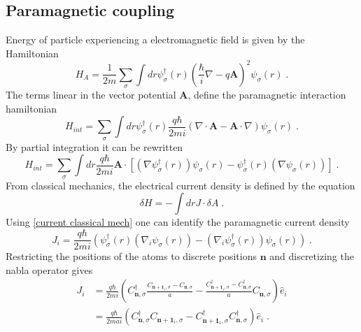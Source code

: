 \documentclass{article}
\begin{document}
\subsection{Paramagnetic coupling}
Energy of particle experiencing a electromagnetic field is given by the Hamiltonian
\begin{equation}
    H_A = \frac{1}{2m} \sum_{\sigma} \int dr \psi_{\sigma}^{\dagger}(r) \left( \frac{\hbar}{i} \nabla - q \textbf{A} \right)^2 \psi_{\sigma}(r)\;.
\end{equation}
The terms linear in the vector potential $\textbf{A}$, define the paramagnetic interaction hamiltonian 
\begin{equation}
    H_{int} = \sum_{\sigma} \int dr  \psi_{\sigma}^{\dagger}(r) \frac{q\hbar}{2mi}\left(  \nabla \cdot \textbf{A}  -  \textbf{A} \cdot \nabla \right) \psi_{\sigma}(r) \;.
\end{equation}
By partial integration it can be rewritten
\begin{equation}
    H_{int} = \sum_{\sigma} \int dr \frac{q\hbar}{2mi} \textbf{A} \cdot \left[  (\nabla  \psi_{\sigma}^{\dagger}(r)) \psi_{\sigma}(r)   -   \psi_{\sigma}^{\dagger}(r) (\nabla \psi_{\sigma}(r))  \right] \;.
\end{equation}
From classical mechanics, the electrical current density is defined by the equation
\begin{equation}
    \delta H = - \int dr J \cdot \delta A \;.
    \label{current classical mech}
\end{equation}
Using \cref{current classical mech} one can identify the paramagnetic current density
\begin{equation}
    J_i = \frac{q \hbar}{2mi} (\psi_{\sigma}^{\dagger}(r) (\nabla_i \psi_{\sigma}(r)) - (\nabla_i  \psi_{\sigma}^{\dagger}(r)) \psi_{\sigma}(r))\;.
\end{equation}
Restricting the positions of the atoms to discrete positions $\textbf{n}$ and discretizing the nabla operator gives
\begin{align}
    J_i &= \frac{q \hbar}{2mi} (C_{\textbf{n},\sigma}^{\dagger} \frac{C_{\textbf{n} + \textbf{1}_i,\sigma} - C_{\textbf{n},\sigma}}{a}  - \frac{C_{\textbf{n} + \textbf{1}_i,\sigma}^{\dagger} - C_{\textbf{n},\sigma}^{\dagger}}{a} C_{\textbf{n},\sigma}) \hat{e}_i\nonumber\\
      &= \frac{q \hbar}{2mai} (C_{\textbf{n},\sigma}^{\dagger} C_{\textbf{n} + \textbf{1}_i,\sigma} - C_{\textbf{n} + \textbf{1}_i,\sigma}^{\dagger} C_{\textbf{n},\sigma}^{\dagger})\hat{e}_i\;.\label{current component} 
\end{align}
\end{document}
